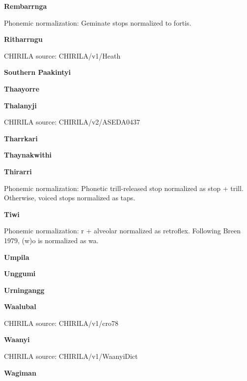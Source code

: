 \textbf{Rembarrnga}


Phonemic normalization: Geminate stops normalized to fortis.

\textbf{Ritharrngu}

CHIRILA source: CHIRILA/v1/Heath


\textbf{Southern Paakintyi}


\textbf{Thaayorre}


\textbf{Thalanyji}

CHIRILA source: CHIRILA/v2/ASEDA0437


\textbf{Tharrkari}


\textbf{Thaynakwithi}


\textbf{Thirarri}


Phonemic normalization: Phonetic trill-released stop normalized as stop
+ trill. Otherwise, voiced stops normalized as taps.

\textbf{Tiwi}


Phonemic normalization: r + alveolar normalized as retroflex. Following
Breen 1979, (w)o is normalized as wa.

\textbf{Umpila}


\textbf{Unggumi}


\textbf{Urningangg}


\textbf{Waalubal}

CHIRILA source: CHIRILA/v1/cro78


\textbf{Waanyi}

CHIRILA source: CHIRILA/v1/WaanyiDict


\textbf{Wagiman}


